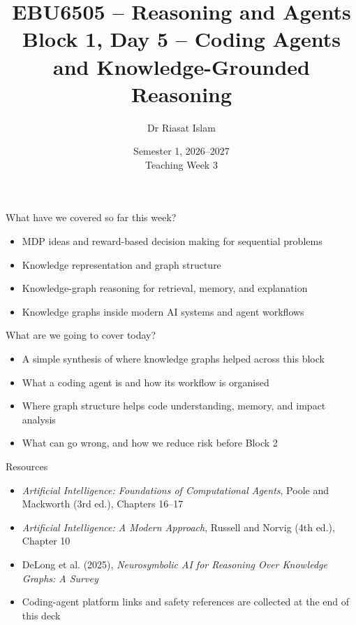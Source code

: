 \documentclass[aspectratio=169]{beamer}
\title[EBU6505 B1 D5]{EBU6505 -- Reasoning and Agents\\Block 1, Day 5 -- Coding Agents and Knowledge-Grounded Reasoning}
\author{Dr Riasat Islam}
\institute{Queen Mary University of London}
\date[Teaching Week 3]{Semester 1, 2026--2027 \\ Teaching Week 3}
\newcommand{\defaultdeckrefs}{AIMA4e Ch.10 pp.314--343; Poole3e Ch.16--17 pp.701--766; platform docs listed at end}
\newcommand{\currentsliderefs}{\defaultdeckrefs}
\newcommand{\setslideref}[1]{\gdef\currentsliderefs{#1}}
\begin{document}
\setslideref{AIMA4e Ch.10 pp.314--343; Poole3e Ch.16--17 pp.701--766; platform docs listed at end}
\begin{frame}
  \titlepage
\end{frame}

\begin{frame}{What have we covered so far this week?}
\begin{itemize}
  \item MDP ideas and reward-based decision making for sequential problems
  \item Knowledge representation and graph structure
  \item Knowledge-graph reasoning for retrieval, memory, and explanation
  \item Knowledge graphs inside modern AI systems and agent workflows
\end{itemize}
\end{frame}

\begin{frame}{What are we going to cover today?}
\begin{itemize}
  \item A simple synthesis of where knowledge graphs helped across this block
  \item What a coding agent is and how its workflow is organised
  \item Where graph structure helps code understanding, memory, and impact analysis
  \item What can go wrong, and how we reduce risk before Block 2
\end{itemize}
\end{frame}

\setslideref{AIMA4e Ch.10 pp.314--343; Poole3e Ch.16--17 pp.701--766; review and system links listed later}
\begin{frame}{Resources}
\begin{itemize}
  \item \textit{Artificial Intelligence: Foundations of Computational Agents}, Poole and Mackworth (3rd ed.), Chapters 16--17
  \item \textit{Artificial Intelligence: A Modern Approach}, Russell and Norvig (4th ed.), Chapter 10
  \item DeLong et al. (2025), \textit{Neurosymbolic AI for Reasoning Over Knowledge Graphs: A Survey}
  \item Coding-agent platform links and safety references are collected at the end of this deck
\end{itemize}
\end{frame}
\end{document}
